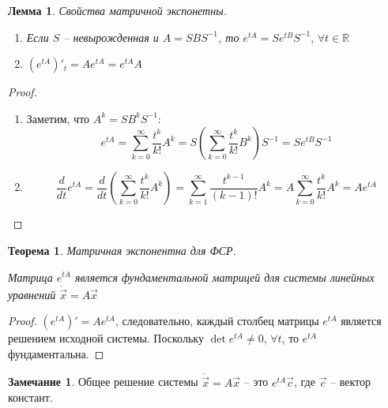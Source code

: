 \documentclass[a4paper,12pt]{article}
\theoremstyle{plain}
\newtheorem{theorem}{Теорема}[section]
\newtheorem{lemma}{Лемма}[section]
\theoremstyle{definition}
\newtheorem*{note}{Замечание}
\theoremstyle{remark}
\begin{document}
\begin{lemma}
	Свойства матричной экспонетны.

	\begin{enumerate}
		\item Если $S$ -- невырожденная и $A = SBS^{-1}$, то $e^{tA} = Se^{tB}S^{-1},\, \forall t \in \mathbb{R}$
		\item $(e^{tA})'_t = Ae^{tA} = e^{tA}A$
	\end{enumerate}
\end{lemma}
\begin{proof}
	\begin{enumerate}
		\item Заметим, что $A^k = SB^kS^{-1}$:
		      \[e^{tA} = \sum_{k=0}^\infty\frac{t^k}{k!}A^k = S \left(\sum_{k = 0}^\infty \frac{t^k}{k!}B^k\right)S^{-1} = Se^{tB}S^{-1}\]
		\item
		      \[\frac{d}{dt}e^{tA} = \frac{d}{dt}\left(\sum_{k=0}^\infty\frac{t^k}{k!}A^k\right) = \sum_{k = 1}^\infty \frac{t^{k-1}}{(k-1)!}A^k = A \sum_{k=0}^\infty\frac{t^k}{k!}A^k = Ae^{tA}\]
	\end{enumerate}
\end{proof}

\begin{theorem}
	Матричная экспонентна для ФСР.

	Матрица $e^{tA}$ является фундаментальной матрицей для системы линейных уравнений $\dot{\vec{x}} = A\vec{x}$
\end{theorem}

\begin{proof}
	$(e^{tA})' = Ae^{tA}$, следовательно, каждый столбец матрицы $e^{tA}$ является решением исходной системы. Поскольку $\det e^{tA} \neq 0,\, \forall t$, то $e^{tA}$ фундаментальна.
\end{proof}

\begin{note}
	Общее решение системы $\dot{\vec{x}} = A\vec{x}$ -- это $e^{tA}\vec{c}$, где $\vec{c}$ -- вектор констант.
\end{note}
\end{document}
